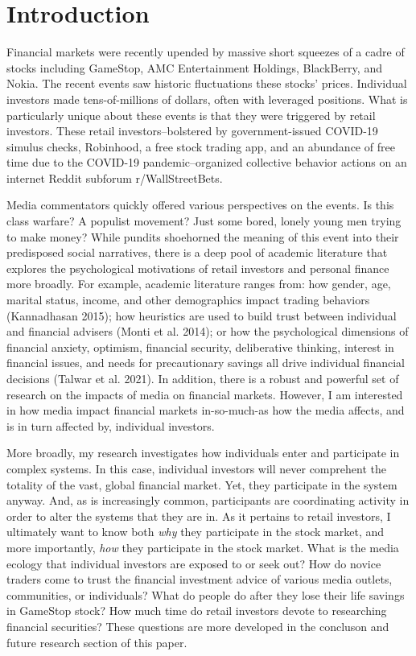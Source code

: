 \documentclass[12pt,]{article}
\begin{document}
\hypertarget{introduction}{%
\section{Introduction}\label{introduction}}

Financial markets were recently upended by massive short squeezes of a
cadre of stocks including GameStop, AMC Entertainment Holdings,
BlackBerry, and Nokia. The recent events saw historic fluctuations these
stocks' prices. Individual investors made tens-of-millions of dollars,
often with leveraged positions. What is particularly unique about these
events is that they were triggered by retail investors. These retail
investors--bolstered by government-issued COVID-19 simulus checks,
Robinhood, a free stock trading app, and an abundance of free time due
to the COVID-19 pandemic--organized collective behavior actions on an
internet Reddit subforum r/WallStreetBets.

Media commentators quickly offered various perspectives on the events.
Is this class warfare? A populist movement? Just some bored, lonely
young men trying to make money? While pundits shoehorned the meaning of
this event into their predisposed social narratives, there is a deep
pool of academic literature that explores the psychological motivations
of retail investors and personal finance more broadly. For example,
academic literature ranges from: how gender, age, marital status,
income, and other demographics impact trading behaviors (Kannadhasan
2015); how heuristics are used to build trust between individual and
financial advisers (Monti et al. 2014); or how the psychological
dimensions of financial anxiety, optimism, financial security,
deliberative thinking, interest in financial issues, and needs for
precautionary savings all drive individual financial decisions (Talwar
et al. 2021). In addition, there is a robust and powerful set of
research on the impacts of media on financial markets. However, I am
interested in how media impact financial markets in-so-much-as how the
media affects, and is in turn affected by, individual investors.

More broadly, my research investigates how individuals enter and
participate in complex systems. In this case, individual investors will
never comprehent the totality of the vast, global financial market. Yet,
they participate in the system anyway. And, as is increasingly common,
participants are coordinating activity in order to alter the systems
that they are in. As it pertains to retail investors, I ultimately want
to know both \emph{why} they participate in the stock market, and more
importantly, \emph{how} they participate in the stock market. What is
the media ecology that individual investors are exposed to or seek out?
How do novice traders come to trust the financial investment advice of
various media outlets, communities, or individuals? What do people do
after they lose their life savings in GameStop stock? How much time do
retail investors devote to researching financial securities? These
questions are more developed in the concluson and future research
section of this paper.
\end{document}
